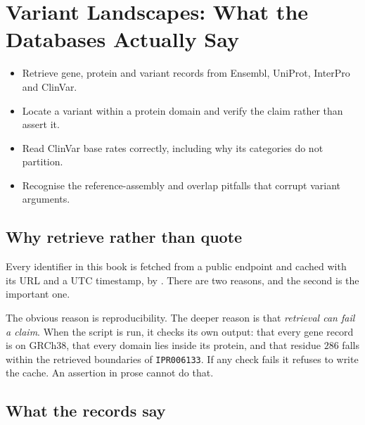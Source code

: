 \section{Variant Landscapes: What the Databases Actually Say}\label{sec:variants}

\begin{objectives}
\begin{itemize}[leftmargin=*,itemsep=1pt,topsep=1pt]
  \item Retrieve gene, protein and variant records from Ensembl, UniProt, InterPro and ClinVar.
  \item Locate a variant within a protein domain and verify the claim rather than assert it.
  \item Read ClinVar base rates correctly, including why its categories do not partition.
  \item Recognise the reference-assembly and overlap pitfalls that corrupt variant arguments.
\end{itemize}
\end{objectives}

\subsection{Why retrieve rather than quote}

Every identifier in this book is fetched from a public endpoint and cached with
its URL and a UTC timestamp, by
. There are two reasons, and the
second is the important one.

The obvious reason is reproducibility. The deeper reason is that \emph{retrieval
can fail a claim}. When the script is run, it checks its own output: that every
gene record is on GRCh38, that every domain lies inside its protein, and that
residue $286$ falls within the retrieved boundaries of \texttt{IPR006133}. If any
check fails it refuses to write the cache. An assertion in prose cannot do that.

\subsection{What the records say}

